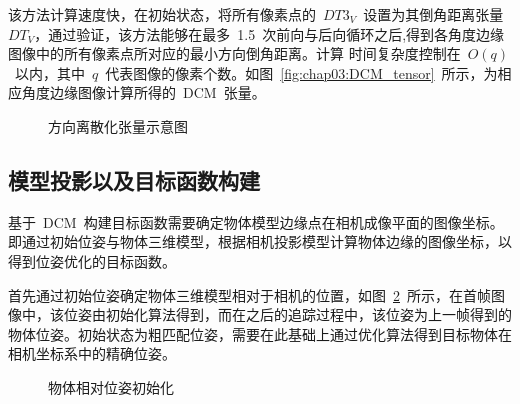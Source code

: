 该方法计算速度快，在初始状态，将所有像素点的~$DT3_V$~设置为其倒角距离张量~$DT_V$，通过验证，该方法能够在最多~1.5~次前向与后向循环之后,得到各角度边缘图像中的所有像素点所对应的最小方向倒角距离\cite{LiuFastObjectLocalization2012}。计算
时间复杂度控制在~$O(q)$~以内，其中~$q$~代表图像的像素个数。如图~\ref{fig:chap03:DCM_tensor}~所示，为相应角度边缘图像计算所得的~DCM~张量。

\begin{figure}[t] %
  \centering%
  \vskip0.2cm
  \vskip0.2cm
  \caption{方向离散化张量示意图}
  \label{fig:chap03:direct_tensor}
\end{figure}

\subsection{模型投影以及目标函数构建} 
\label{sec:Objective function Building}
基于~DCM~构建目标函数需要确定物体模型边缘点在相机成像平面的图像坐标。即通过初始位姿与物体三维模型，根据相机投影模型计算物体边缘的图像坐标，以得到位姿优化的目标函数。

首先通过初始位姿确定物体三维模型相对于相机的位置，如图~\ref{fig:chap03:pose_init}~所示，在首帧图像中，该位姿由初始化算法得到，而在之后的追踪过程中，该位姿为上一帧得到的物体位姿。初始状态为粗匹配位姿，需要在此基础上通过优化算法得到目标物体在
相机坐标系中的精确位姿。

\begin{figure}[t] %
  \centering%
  \hspace{1em}%
  \caption{物体相对位姿初始化}
  \label{fig:chap03:pose_init}
\end{figure}

